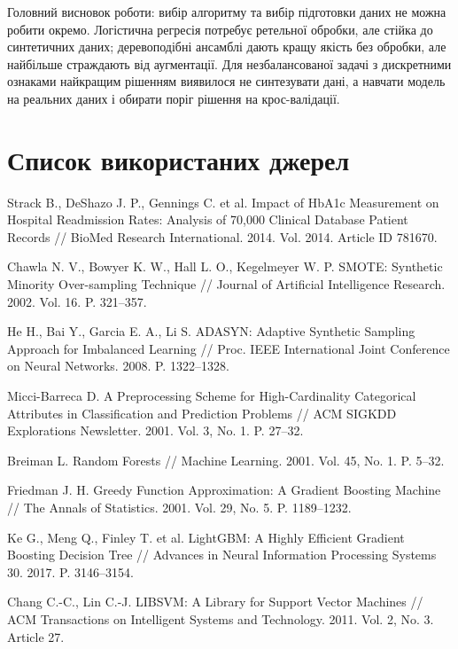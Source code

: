 \documentclass[14pt,a4paper]{extreport}
\begin{document}
Головний висновок роботи: вибір алгоритму та вибір підготовки даних не можна робити окремо. Логістична регресія потребує ретельної обробки, але стійка до синтетичних даних; деревоподібні ансамблі дають кращу якість без обробки, але найбільше страждають від аугментації. Для незбалансованої задачі з дискретними ознаками найкращим рішенням виявилося не синтезувати дані, а навчати модель на реальних даних і обирати поріг рішення на крос-валідації.

\section*{Список використаних джерел}

\begin{enumerate}[label={[\arabic*]},ref={\arabic*},leftmargin=*,labelindent=0pt]
\item \label{ref:strack} Strack B., DeShazo J. P., Gennings C. et al. Impact of HbA1c Measurement on Hospital Readmission Rates: Analysis of 70,000 Clinical Database Patient Records // BioMed Research International. 2014. Vol. 2014. Article ID 781670.
\item \label{ref:smote} Chawla N. V., Bowyer K. W., Hall L. O., Kegelmeyer W. P. SMOTE: Synthetic Minority Over-sampling Technique // Journal of Artificial Intelligence Research. 2002. Vol. 16. P. 321--357.
\item \label{ref:adasyn} He H., Bai Y., Garcia E. A., Li S. ADASYN: Adaptive Synthetic Sampling Approach for Imbalanced Learning // Proc. IEEE International Joint Conference on Neural Networks. 2008. P. 1322--1328.
\item \label{ref:target} Micci-Barreca D. A Preprocessing Scheme for High-Cardinality Categorical Attributes in Classification and Prediction Problems // ACM SIGKDD Explorations Newsletter. 2001. Vol. 3, No. 1. P. 27--32.
\item \label{ref:breiman} Breiman L. Random Forests // Machine Learning. 2001. Vol. 45, No. 1. P. 5--32.
\item \label{ref:friedman} Friedman J. H. Greedy Function Approximation: A Gradient Boosting Machine // The Annals of Statistics. 2001. Vol. 29, No. 5. P. 1189--1232.
\item \label{ref:lightgbm} Ke G., Meng Q., Finley T. et al. LightGBM: A Highly Efficient Gradient Boosting Decision Tree // Advances in Neural Information Processing Systems 30. 2017. P. 3146--3154.
\item \label{ref:libsvm} Chang C.-C., Lin C.-J. LIBSVM: A Library for Support Vector Machines // ACM Transactions on Intelligent Systems and Technology. 2011. Vol. 2, No. 3. Article 27.

\end{enumerate}
\end{document}
